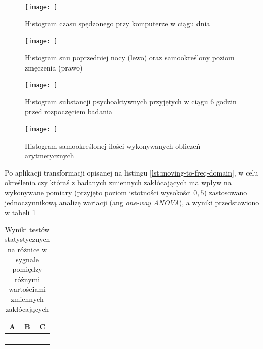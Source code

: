 \documentclass{./assets/wfis}
\begin{document}
\begin{figure}[h!]
    \centering
    \texttt{[image: ]}
    \caption{Histogram czasu spędzonego przy komputerze w ciągu dnia}
    \label{fig:computer-time}
\end{figure}

\begin{figure}[h!]
    \centering
    \texttt{[image: ]}
    \caption{Histogram snu poprzedniej nocy (lewo) oraz samookreślony poziom zmęczenia (prawo) }
    \label{fig:sleep-time-and-tired}
\end{figure}

\begin{figure}[h!]
    \centering
    \texttt{[image: ]}
    \caption{Histogram substancji psychoaktywnych przyjętych w ciągu 6 godzin przed rozpoczęciem badania}
    \label{fig:psychoactive-substances}
\end{figure}

\begin{figure}[h!]
    \centering
    \texttt{[image: ]}
    \caption{Histogram samookreślonej ilości wykonywanych obliczeń arytmetycznych}
    \label{fig:arithmetic}
\end{figure}

Po aplikacji transformacji opisanej na listingu \ref{lst:moving-to-freq-domain}, w celu określenia czy któraś z badanych zmiennych zakłócających ma wpływ na wykonywane pomiary (przyjęto poziom istotności wysokości $0,5$) zastosowano jednoczynnikową analizę wariacji (ang \textit{one-way ANOVA}), a wyniki przedstawiono w tabeli \ref{tab:confunding-variables-statistical-tests} 
\begin{table}[h!]
    \centering
    \begin{tabular}{|c|c|c|}
        \hline
        A & B & C  \\
        \hline
         &  &  \\
         &  & \\
         & & \\
         & & \\
        \hline
    \end{tabular}
    \caption{Wyniki testów statystycznych na różnice w sygnale pomiędzy różnymi wartościami zmiennych zakłócających}
    \label{tab:confunding-variables-statistical-tests}
\end{table}



\end{document}
